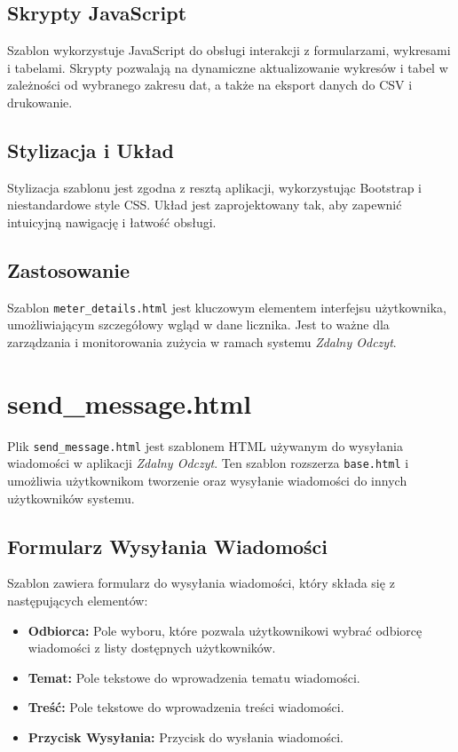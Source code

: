 \documentclass[12pt,a4paper]{report}
\begin{document}
\subsection{Skrypty JavaScript}
Szablon wykorzystuje JavaScript do obsługi interakcji z formularzami, wykresami i tabelami. Skrypty pozwalają na dynamiczne aktualizowanie wykresów i tabel w zależności od wybranego zakresu dat, a także na eksport danych do CSV i drukowanie.

\subsection{Stylizacja i Układ}
Stylizacja szablonu jest zgodna z resztą aplikacji, wykorzystując Bootstrap i niestandardowe style CSS. Układ jest zaprojektowany tak, aby zapewnić intuicyjną nawigację i łatwość obsługi.

\subsection{Zastosowanie}
Szablon \texttt{meter\_details.html} jest kluczowym elementem interfejsu użytkownika, umożliwiającym szczegółowy wgląd w dane licznika. Jest to ważne dla zarządzania i monitorowania zużycia w ramach systemu \textit{Zdalny Odczyt}.


\section{send\_message.html}
\label{sec:sendmessage}
Plik \texttt{send\_message.html} jest szablonem HTML używanym do wysyłania wiadomości w aplikacji \textit{Zdalny Odczyt}. Ten szablon rozszerza \texttt{base.html} i umożliwia użytkownikom tworzenie oraz wysyłanie wiadomości do innych użytkowników systemu.

\subsection{Formularz Wysyłania Wiadomości}
Szablon zawiera formularz do wysyłania wiadomości, który składa się z następujących elementów:
\begin{itemize}
\item \textbf{Odbiorca:} Pole wyboru, które pozwala użytkownikowi wybrać odbiorcę wiadomości z listy dostępnych użytkowników.
\item \textbf{Temat:} Pole tekstowe do wprowadzenia tematu wiadomości.
\item \textbf{Treść:} Pole tekstowe do wprowadzenia treści wiadomości.
\item \textbf{Przycisk Wysyłania:} Przycisk do wysłania wiadomości.
\end{itemize}
\end{document}

